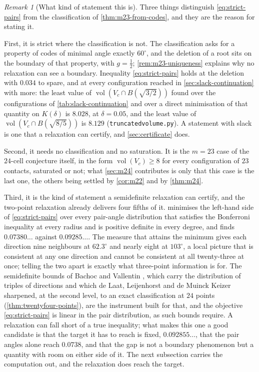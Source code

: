 \documentclass[11pt,reqno]{amsart}
\renewcommand{\_}{\origunderscore\allowbreak}
\numberwithin{equation}{section}
\theoremstyle{plain}
\theoremstyle{definition}
\theoremstyle{remark}
\newtheorem{remark}[thm]{Remark}
\DeclareMathOperator{\vol}{vol}
\begin{document}
\begin{remark}[What kind of statement this is]\label{rem:strict-kind}
Three things distinguish \eqref{eq:strict-pairs} from the classification
of \cref{thm:m23-from-codes}, and they are the reason for stating it.

First, it is strict where the classification is not. The classification
asks for a property of codes of minimal angle exactly $60^\circ$, and
the deletion of a root sits on the boundary of that property, with
$g=\tfrac12$; \cref{rem:m23-uniqueness} explains why no relaxation can
see a boundary. Inequality \eqref{eq:strict-pairs} holds at the
deletion with $0.034$ to spare, and at every configuration reached in
\cref{sec:slack-continuation} with more: the least value of
$\vol(V_c\cap B(\sqrt{3/2}))$ found over the configurations of
\cref{tab:slack-continuation} and over a direct minimisation of that
quantity on $K(\delta)$ is $8.028$, at $\delta=0.05$, and the least
value of $\vol(V_c\cap B(\sqrt{8/5}))$ is $8.129$
(\texttt{truncated\_volume.py}). A statement with slack is one that a
relaxation can certify, and \cref{sec:certificate} does.

Second, it needs no classification and no saturation. It is the
$m=23$ case of the $24$-cell conjecture itself, in the form
$\vol(V_c)\ge8$ for every configuration of $23$ contacts, saturated or
not; what \cref{sec:m24} contributes is only that this case is the
last one, the others being settled by \cref{cor:m22} and by
\cref{thm:m24}.

Third, it is the kind of statement a semidefinite relaxation can
certify, and the two-point relaxation already delivers four fifths of
it.  minimises the left-hand side of
\eqref{eq:strict-pairs} over every pair-angle distribution that
satisfies the Bonferroni inequality at every radius and is positive
definite in every degree, and finds $0.07380\ldots$ against
$0.09285\ldots$. The measure that attains the minimum gives each
direction nine neighbours at $62.3^\circ$ and nearly eight at
$103^\circ$, a local picture that is consistent at any one direction
and cannot be consistent at all twenty-three at once; telling the two
apart is exactly what three-point information is for. The
semidefinite bounds of Bachoc and Vallentin \cite{BV08}, which carry
the distribution of triples of directions and which de Laat,
Leijenhorst and de Muinck Keizer \cite{LLM24} sharpened, at the second
level, to an exact classification at $24$ points
(\cref{thm:twentyfour-points}), are the instrument built for that, and
the objective \eqref{eq:strict-pairs} is linear in the pair
distribution, as such bounds require. A relaxation can fall short of a
true inequality; what makes this one a good candidate is that the
target it has to reach is fixed, $0.092855\ldots$, that the pair
angles alone reach $0.0738$, and that the gap is not a boundary
phenomenon but a quantity with room on either side of it. The next
subsection carries the computation out, and the relaxation does reach
the target.
\end{remark}
\end{document}
